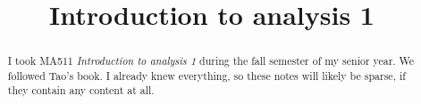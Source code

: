 \documentclass[11pt, letterpaper]{report}
\title{Introduction to analysis 1}
\theoremstyle{definition}
\begin{document}
    \maketitle
    \tableofcontents

    \begin{abstract}
	    I took MA511 \emph{Introduction to analysis 1} during the fall semester of my senior year. We followed Tao's book. I already knew everything, so these notes will likely be sparse, if they contain any content at all.
    \end{abstract}
    
    
\end{document}
